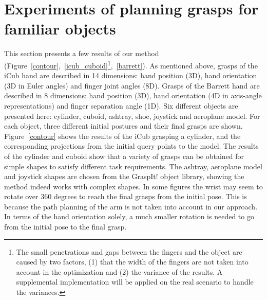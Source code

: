 \section{Experiments of planning grasps for familiar objects}
\label{cha3:sec3}

This section presents a few results of our method (Figure~\ref{contour},~\ref{icub_cuboid}\footnote{The small penetrations and gaps between the fingers and the object are caused by two factors, (1) that the width of the fingers are not taken into account in the optimization and (2) the variance of the results. A supplemental implementation will be applied on the real scenario to handle the variances.},~\ref{barrett}). As mentioned above, grasps of the iCub hand are described in 14 dimensions: hand position (3D), hand orientation (3D in Euler angles) and finger joint angles (8D). Grasps of the Barrett hand are described in 8 dimensions: hand position (3D), hand orientation (4D in axis-angle representations) and finger separation angle (1D). Six different objects are presented here: cylinder, cuboid, ashtray, shoe, joystick and aeroplane model. For each object, three different initial postures and their final grasps are shown. Figure~\ref{contour} shows the results of the iCub grasping a cylinder, and the corresponding projections from the initial query points to the model. The results of the cylinder and cuboid show that a variety of grasps can be obtained for simple shapes to satisfy different task requirements. The ashtray, aeroplane model and joystick shapes are chosen from the GraspIt! object library, showing the method indeed works with complex shapes. In some figures the wrist may seem to rotate over 360 degrees to reach the final grasps from the initial pose. This is because the path planning of the arm is not taken into account in our approach. In terms of the hand orientation solely, a much smaller rotation is needed to go from the initial pose to the final grasp.

